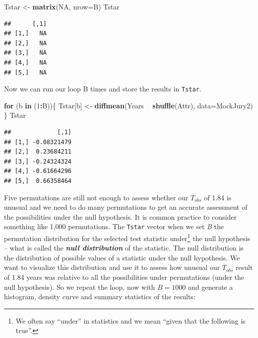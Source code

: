 \documentclass[]{book}
\newenvironment{Shaded}{\begin{snugshade}}{\end{snugshade}}
\newcommand{\KeywordTok}[1]{\textcolor[rgb]{0.13,0.29,0.53}{\textbf{#1}}}
\newcommand{\DataTypeTok}[1]{\textcolor[rgb]{0.13,0.29,0.53}{#1}}
\newcommand{\DecValTok}[1]{\textcolor[rgb]{0.00,0.00,0.81}{#1}}
\newcommand{\StringTok}[1]{\textcolor[rgb]{0.31,0.60,0.02}{#1}}
\newcommand{\OtherTok}[1]{\textcolor[rgb]{0.56,0.35,0.01}{#1}}
\newcommand{\ControlFlowTok}[1]{\textcolor[rgb]{0.13,0.29,0.53}{\textbf{#1}}}
\newcommand{\OperatorTok}[1]{\textcolor[rgb]{0.81,0.36,0.00}{\textbf{#1}}}
\newcommand{\NormalTok}[1]{#1}
\let\rmarkdownfootnote\footnote%
\def\footnote{\protect\rmarkdownfootnote}
\begin{document}
\begin{Shaded}
\begin{Highlighting}[]
\NormalTok{Tstar <-}\StringTok{ }\KeywordTok{matrix}\NormalTok{(}\OtherTok{NA}\NormalTok{, }\DataTypeTok{nrow=}\NormalTok{B)}
\NormalTok{Tstar}
\end{Highlighting}
\end{Shaded}

\begin{verbatim}
##      [,1]
## [1,]   NA
## [2,]   NA
## [3,]   NA
## [4,]   NA
## [5,]   NA
\end{verbatim}

Now we can run our loop B times and store the results in \texttt{Tstar}.

\begin{Shaded}
\begin{Highlighting}[]
\ControlFlowTok{for}\NormalTok{ (b }\ControlFlowTok{in}\NormalTok{ (}\DecValTok{1}\OperatorTok{:}\NormalTok{B))\{}
\NormalTok{  Tstar[b] <-}\StringTok{ }\KeywordTok{diffmean}\NormalTok{(Years }\OperatorTok{~}\StringTok{ }\KeywordTok{shuffle}\NormalTok{(Attr), }\DataTypeTok{data=}\NormalTok{MockJury2)}
\NormalTok{\}}
\NormalTok{Tstar}
\end{Highlighting}
\end{Shaded}

\begin{verbatim}
##             [,1]
## [1,] -0.08321479
## [2,]  0.23684211
## [3,] -0.24324324
## [4,] -0.61664296
## [5,]  0.66358464
\end{verbatim}

Five permutations are still not enough to assess whether our \(T_{obs}\)
of 1.84 is unusual and we need to do many permutations to get an
accurate assessment of the possibilities under the null hypothesis. It
is common practice to consider something like 1,000 permutations. The
\texttt{Tstar} vector when we set \emph{B} the permutation distribution
for the selected test statistic under\footnote{We often say ``under'' in
  statistics and we mean ``given that the following is true''.} the null
hypothesis -- what is called the \textbf{\emph{null distribution}} of
the statistic. The null distribution is the distribution of possible
values of a statistic under the null hypothesis. We want to visualize
this distribution and use it to assess how unusual our \(T_{obs}\)
result of 1.84 years was relative to all the possibilities under
permutations (under the null hypothesis). So we repeat the loop, now
with \(B=1000\) and generate a histogram, density curve and summary
statistics of the results:
\end{document}
